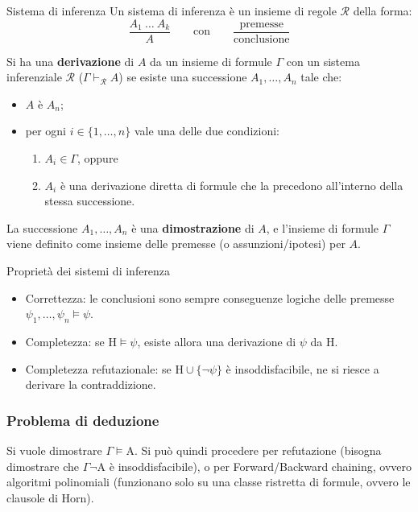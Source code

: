 \documentclass[11pt, a4paper]{article}
\begin{document}
\begin{defbox}{Sistema di inferenza}
  Un sistema di inferenza è un insieme di regole $\mathcal{R}$ della forma:
  \[
    \frac{A_1 \ \dots \ A_k}{A}
    \qquad \text{con} \qquad
    \frac{\text{premesse}}{\text{conclusione}}
  \]
\end{defbox}

Si ha una \textbf{derivazione} di $A$ da un insieme di formule $\Gamma$ con un sistema inferenziale $\mathcal{R}$ ($\Gamma \vdash_{\mathcal{R}} A$) se esiste una successione $A_1, \dots, A_n$ tale che:
\begin{itemize}
  \item $A$ è $A_n$;
  \item per ogni $i \in \{1, \dots, n\}$ vale una delle due condizioni:
  \begin{enumerate}
    \item $A_i \in \Gamma$, oppure
    \item $A_i$ è una derivazione diretta di formule che la precedono all'interno della stessa successione.
  \end{enumerate}
\end{itemize}

La successione $A_1, \dots, A_n$ è una \textbf{dimostrazione} di $A$, e l'insieme di formule $\Gamma$ viene definito come insieme delle premesse (o assunzioni/ipotesi) per $A$.

\begin{proprietà}{Proprietà dei sistemi di inferenza}
  \begin{itemize}
    \item Correttezza: le conclusioni sono sempre conseguenze logiche delle premesse $\psi_1,\dots,\psi_n\models\psi$.
    \item Completezza: se $\text{H}\models\psi$, esiste allora una derivazione di $\psi$ da H.
    \item Completezza refutazionale: se $\text{H}\cup\{\lnot\psi\}$ è insoddisfacibile, ne si riesce a derivare la contraddizione.
  \end{itemize}
\end{proprietà}

\subsubsection*{Problema di deduzione}

  Si vuole dimostrare $\Gamma\models\text{A}$. Si può quindi procedere per refutazione (bisogna dimostrare che $\Gamma\lnot\text{A}$ è insoddisfacibile), o per Forward/Backward chaining, ovvero algoritmi polinomiali (funzionano solo su una classe ristretta di formule, ovvero le clausole di Horn).
\end{document}
